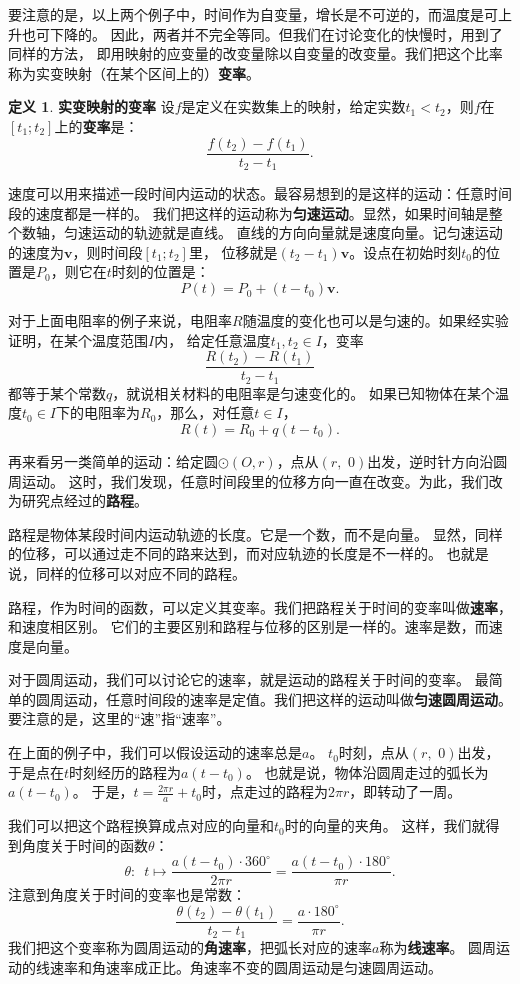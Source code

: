 \documentclass[12pt,UTF8]{ctexbook}
\theoremstyle{definition}
\newtheorem{df}{定义}[section]
\theoremstyle{plain}
\begin{document}
要注意的是，以上两个例子中，时间作为自变量，增长是不可逆的，而温度是可上升也可下降的。
因此，两者并不完全等同。但我们在讨论变化的快慢时，用到了同样的方法，
即用映射的应变量的改变量除以自变量的改变量。我们把这个比率称为实变映射（在某个区间上的）\textbf{变率}。

\begin{df}{\textbf{实变映射的变率}}
    设$f$是定义在实数集上的映射，给定实数$t_1 < t_2$，则$f$在$[t_1;t_2]$上的\textbf{变率}是：
    $$ \frac{f(t_2) - f(t_1)}{t_2 - t_1}.$$
\end{df}

速度可以用来描述一段时间内运动的状态。最容易想到的是这样的运动：任意时间段的速度都是一样的。
我们把这样的运动称为\textbf{匀速运动}。显然，如果时间轴是整个数轴，匀速运动的轨迹就是直线。
直线的方向向量就是速度向量。记匀速运动的速度为$\mathbf{v}$，则时间段$[t_1;t_2]$里，
位移就是$(t_2 - t_1)\mathbf{v}$。设点在初始时刻$t_0$的位置是$P_0$，则它在$t$时刻的位置是：
$$P(t) = P_0 + (t - t_0)\mathbf{v}.$$

对于上面电阻率的例子来说，电阻率$R$随温度的变化也可以是匀速的。如果经实验证明，在某个温度范围$I$内，
给定任意温度$t_1, t_2 \in I$，变率
$$ \frac{R(t_2) - R(t_1)}{t_2 - t_1} $$
都等于某个常数$q$，就说相关材料的电阻率是匀速变化的。
如果已知物体在某个温度$t_0\in I$下的电阻率为$R_0$，那么，对任意$t\in I$，
$$ R(t) = R_0 + q(t - t_0). $$

再来看另一类简单的运动：给定圆$\odot(O, r)$，点从$(r,\,\, 0)$出发，逆时针方向沿圆周运动。
这时，我们发现，任意时间段里的位移方向一直在改变。为此，我们改为研究点经过的\textbf{路程}。

路程是物体某段时间内运动轨迹的长度。它是一个数，而不是向量。
显然，同样的位移，可以通过走不同的路来达到，而对应轨迹的长度是不一样的。
也就是说，同样的位移可以对应不同的路程。

路程，作为时间的函数，可以定义其变率。我们把路程关于时间的变率叫做\textbf{速率}，和速度相区别。
它们的主要区别和路程与位移的区别是一样的。速率是数，而速度是向量。

对于圆周运动，我们可以讨论它的速率，就是运动的路程关于时间的变率。
最简单的圆周运动，任意时间段的速率是定值。我们把这样的运动叫做\textbf{匀速圆周运动}。
要注意的是，这里的“速”指“速率”。

在上面的例子中，我们可以假设运动的速率总是$a$。
$t_0$时刻，点从$(r,\,\, 0)$出发，于是点在$t$时刻经历的路程为$a(t - t_0)$。
也就是说，物体沿圆周走过的弧长为$a(t - t_0)$。
于是，$t = \frac{2\pi r}{a} + t_0$时，点走过的路程为$2\pi r$，即转动了一周。

我们可以把这个路程换算成点对应的向量和$t_0$时的向量的夹角。
这样，我们就得到角度关于时间的函数$\theta$：
$$ \theta : \,\,\, t \mapsto \frac{a(t - t_0)\cdot 360^\circ}{2\pi r} = \frac{a(t - t_0)\cdot 180^\circ}{\pi r}.$$
注意到角度关于时间的变率也是常数：
$$ \frac{\theta(t_2) - \theta(t_1)}{t_2 - t_1} = \frac{a \cdot 180^\circ}{\pi r}.$$
我们把这个变率称为圆周运动的\textbf{角速率}，把弧长对应的速率$a$称为\textbf{线速率}。
圆周运动的线速率和角速率成正比。角速率不变的圆周运动是匀速圆周运动。
\end{document}
